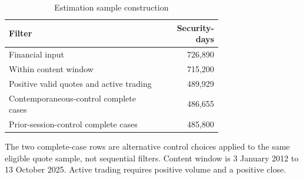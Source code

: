 \begin{table}[htbp]
\centering
\caption{Estimation sample construction}
\label{tab:flow}
\begin{minipage}{\linewidth}
\small
\setlength{\tabcolsep}{4pt}
\begingroup\centering
\begin{tabular}{p{0.72\linewidth}r}
\toprule
Filter & Security-days \\
\midrule
Financial input & 726,890 \\
Within content window & 715,200 \\
Positive valid quotes and active trading & 489,929 \\
Contemporaneous-control complete cases & 486,655 \\
Prior-session-control complete cases & 485,800 \\
\bottomrule
\end{tabular}\par\endgroup
\par\vspace{0.5em}\footnotesize The two complete-case rows are alternative control choices applied to the same eligible quote sample, not sequential filters. Content window is 3 January 2012 to 13 October 2025. Active trading requires positive volume and a positive close.
\end{minipage}
\end{table}
